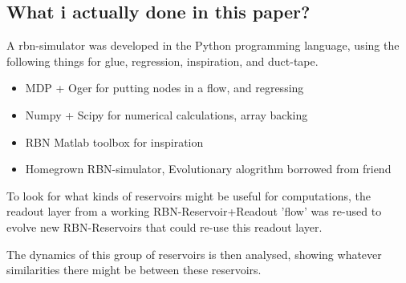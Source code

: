 \subsection{What i actually done in this paper?}

A rbn-simulator was developed in the Python programming language,
using the following things for glue, regression, inspiration, and duct-tape.

\begin{itemize}
  \item MDP + Oger for putting nodes in a flow, and regressing
  \item Numpy + Scipy for numerical calculations, array backing
  \item RBN Matlab toolbox for inspiration
  \item Homegrown RBN-simulator, Evolutionary alogrithm borrowed from friend
\end{itemize}

To look for what kinds of reservoirs might be useful for computations,
the readout layer from a working RBN-Reservoir+Readout 'flow' was re-used to evolve new RBN-Reservoirs that could re-use this readout layer.

The dynamics of this group of reservoirs is then analysed,
showing whatever similarities there might be between these reservoirs.
